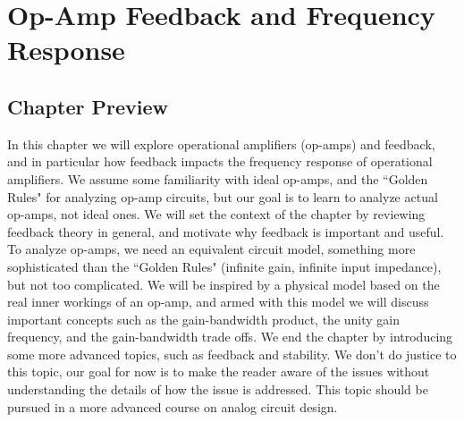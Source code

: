 \chapter{Op-Amp Feedback and Frequency Response}
\graphicspath{{./figs_opamps_fb/}}
\section{Chapter Preview}
In this chapter we will explore operational amplifiers (op-amps) and feedback, and in particular how feedback impacts the frequency response of operational amplifiers.  We assume some familiarity with ideal op-amps, and the ``Golden Rules" for analyzing op-amp circuits, but our goal is to learn to analyze actual op-amps, not ideal ones.  We will set the context of the chapter by reviewing feedback theory in general, and motivate why feedback is important and useful.  To analyze op-amps, we need an equivalent circuit model, something more sophisticated than the ``Golden Rules" (infinite gain, infinite input impedance), but not too complicated.   We will be inspired by a physical model based on the real inner workings of an op-amp, and armed with this model we will discuss important concepts such as the gain-bandwidth product, the unity gain frequency, and the gain-bandwidth trade offs.  We end the chapter by introducing some more advanced topics, such as feedback and stability.  We don't do justice to this topic, our goal for now is to make the reader aware of the issues without understanding the details of how the issue is addressed.  This topic should be pursued in a more advanced course on analog circuit design. 
